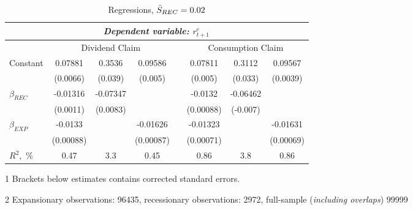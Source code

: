 \begin{table}[H]
\centering
\caption{Regressions, $\Bar{S}_{REC} = 0.02$}  
\label{tab:tabregress2}
\begin{threeparttable}
\begin{tabular}{@{}lccccccc@{}}
\toprule
& \multicolumn{6}{c}{\textit{Dependent variable: $r^{e}_{t+1}$}} \\ 
\midrule
& \multicolumn{3}{c}{Dividend Claim} && \multicolumn{3}{c}{Consumption Claim} \\
\cmidrule(lr){2-4} \cmidrule(lr){6-8}
Constant & 0.07881  & 0.3536  & 0.09586 && 0.07811 & 0.3112 & 0.09567 \\
         & (0.0066) & (0.039) & (0.005) &&(0.005) & (0.033)& (0.0039)\\
\addlinespace
$\beta_{REC}$ &-0.01316  & -0.07347 &&& -0.0132    & -0.06462 & \\
              & (0.0011) & (0.0083)  &&& (0.00088) & (-0.007) & \\
\addlinespace 
$\beta_{EXP}$ & -0.0133 & & -0.01626   && -0.01323  && -0.01631\\
              & (0.00088) & & (0.00087)&& (0.00071) && (0.00069)\\
\addlinespace
$R^2$,~\%         & 0.47 & 3.3 & 0.45 & & 0.86 & 3.8 & 0.86 \\
\bottomrule
\end{tabular}
\begin{tablenotes}\footnotesize{
\item[1] Brackets below estimates contains \citet{NW87} corrected standard errors. 
\item[2] Expansionary observations: 96435, recessionary observations: 2972, full-sample (\textit{including overlaps}) 99999}
\end{tablenotes}
\end{threeparttable}
\end{table}

